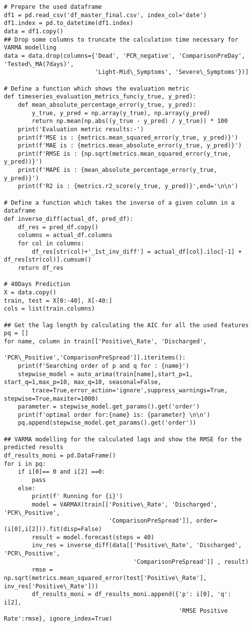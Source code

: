 \begin{appendices}
\begin{verbatim}
# Prepare the used dataframe
df1 = pd.read_csv('df_master_final.csv', index_col='date')
df1.index = pd.to_datetime(df1.index)
data = df1.copy()
## Drop some columns to truncate the calculation time necessary for VARMA modelling
data = data.drop(columns={'Dead', 'PCR_negative', 'ComparisonPreDay', 'Tested\_MA(7days)',
                          'Light-Mid\_Symptoms', 'Severe\_Symptoms'})]

# Define a function which shows the evaluation metric
def timeseries_evaluation_metrics_func(y_true, y_pred):    
    def mean_absolute_percentage_error(y_true, y_pred): 
        y_true, y_pred = np.array(y_true), np.array(y_pred)
        return np.mean(np.abs((y_true - y_pred) / y_true)) * 100
    print('Evaluation metric results:-')
    print(f'MSE is : {metrics.mean_squared_error(y_true, y_pred)}')
    print(f'MAE is : {metrics.mean_absolute_error(y_true, y_pred)}')
    print(f'RMSE is : {np.sqrt(metrics.mean_squared_error(y_true, y_pred))}')
    print(f'MAPE is : {mean_absolute_percentage_error(y_true, y_pred)}')
    print(f'R2 is : {metrics.r2_score(y_true, y_pred)}',end='\n\n')

# Define a function which takes the inverse of a given column in a dataframe
def inverse_diff(actual_df, pred_df):
    df_res = pred_df.copy()
    columns = actual_df.columns
    for col in columns: 
        df_res[str(col)+'_1st_inv_diff'] = actual_df[col].iloc[-1] + df_res[str(col)].cumsum()
    return df_res

# 40Days Prediction
X = data.copy()
train, test = X[0:-40], X[-40:]
cols = list(train.columns)

## Get the lag length by calculating the AIC for all the used features
pq = []
for name, column in train[['Positive\_Rate', 'Discharged', 
                           'PCR\_Positive','ComparisonPreSpread']].iteritems():
    print(f'Searching order of p and q for : {name}')
    stepwise_model = auto_arima(train[name],start_p=1, start_q=1,max_p=10, max_q=10, seasonal=False,
        trace=True,error_action='ignore',suppress_warnings=True, stepwise=True,maxiter=1000)
    parameter = stepwise_model.get_params().get('order')
    print(f'optimal order for:{name} is: {parameter} \n\n')
    pq.append(stepwise_model.get_params().get('order'))

## VARMA modelling for the calculated lags and show the RMSE for the predicted results
df_results_moni = pd.DataFrame()
for i in pq:
    if i[0]== 0 and i[2] ==0:
        pass
    else:
        print(f' Running for {i}')
        model = VARMAX(train[['Positive\_Rate', 'Discharged', 'PCR\_Positive', 
                              'ComparisonPreSpread']], order=(i[0],i[2])).fit(disp=False)
        result = model.forecast(steps = 40)
        inv_res = inverse_diff(data[['Positive\_Rate', 'Discharged', 'PCR\_Positive',
                                     'ComparisonPreSpread']] , result)
        rmse = np.sqrt(metrics.mean_squared_error(test['Positive\_Rate'], inv_res['Positive\_Rate']))
        df_results_moni = df_results_moni.append({'p': i[0], 'q': i[2],
                                                  'RMSE Positive Rate':rmse}, ignore_index=True)


\end{verbatim}
\end{appendices}
